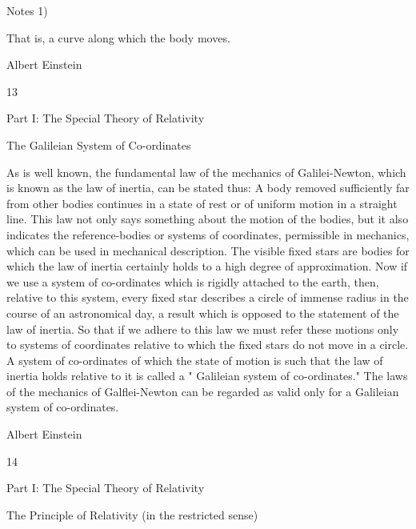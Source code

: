 \documentclass{article}
\begin{document}
Notes
1)

That is, a curve along which the body moves.

Albert Einstein

13

Part I: The Special Theory of Relativity

The Galileian System of
Co-ordinates

As is well known, the fundamental law of the mechanics of Galilei-Newton, which is
known as the law of inertia, can be stated thus: A body removed sufficiently far from other
bodies continues in a state of rest or of uniform motion in a straight line. This law not only
says something about the motion of the bodies, but it also indicates the reference-bodies or
systems of coordinates, permissible in mechanics, which can be used in mechanical
description. The visible fixed stars are bodies for which the law of inertia certainly holds to
a high degree of approximation. Now if we use a system of co-ordinates which is rigidly
attached to the earth, then, relative to this system, every fixed star describes a circle of
immense radius in the course of an astronomical day, a result which is opposed to the
statement of the law of inertia. So that if we adhere to this law we must refer these motions
only to systems of coordinates relative to which the fixed stars do not move in a circle. A
system of co-ordinates of which the state of motion is such that the law of inertia holds
relative to it is called a " Galileian system of co-ordinates." The laws of the mechanics of
Galflei-Newton can be regarded as valid only for a Galileian system of co-ordinates.

Albert Einstein

14

Part I: The Special Theory of Relativity

The Principle of Relativity
(in the restricted sense)
\end{document}
